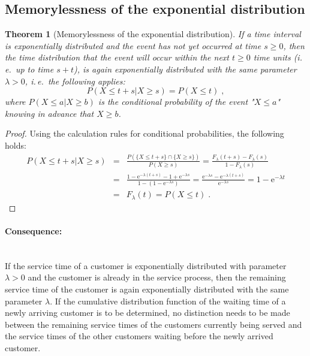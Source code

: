 \documentclass[a4paper,11pt,oneside]{article}
\newtheorem{theorem}{Theorem}
\theoremstyle{definition}
\begin{document}
\subsection{Memorylessness of the exponential distribution}

\begin{theorem}[Memorylessness of the exponential distribution]
If a time interval is exponentially distributed and the event has not yet occurred at time $s\ge0$, then the time distribution that the event will occur within the next $t\ge0$ time units (i.\,e.\ up to time $s+t$), is again exponentially distributed with the same parameter $\lambda>0$, i.\,e.\ the following applies:
\begin{equation}\label{eq:DefinitionMemorylessness}
P(X\le t+s | X\ge s)=P(X\le t)\;,
\end{equation}
where $P(X\le a| X\ge b)$ is the conditional probability of the event "$X\le a$" knowing in advance that $X\ge b$.
\end{theorem}

\begin{proof}
Using the calculation rules for conditional probabilities, the following holds:
\begin{eqnarray*}
P(X\le t+s | X\ge s)&=&
\frac{P(\{X\le t+s\}\cap\{X\ge s\})}{P(X\ge s)}=
\frac{F_\lambda(t+s)-F_\lambda(s)}{1-F_\lambda(s)}\\&=&
\frac{1-\mathrm{e}^{-\lambda(t+s)}-1+\mathrm{e}^{-\lambda s}}{1-(1-\mathrm{e}^{-\lambda s})}=
\frac{\mathrm{e}^{-\lambda s}-\mathrm{e}^{-\lambda(t+s)}}{\mathrm{e}^{-\lambda s}}=
1-\mathrm{e}^{-\lambda t}\\&=&
F_\lambda(t)=
P(X\le t)\;.
\end{eqnarray*}
\end{proof}

\paragraph{Consequence:}~\\
If the service time of a customer is exponentially distributed with parameter $\lambda>0$ and the customer is already in the service process, then the remaining service time of the customer is again exponentially distributed with the same parameter $\lambda$. If the cumulative distribution function of the waiting time of a newly arriving customer is to be determined, no distinction needs to be made between the remaining service times of the customers currently being served and the service times of the other customers waiting before the newly arrived customer.
\end{document}
